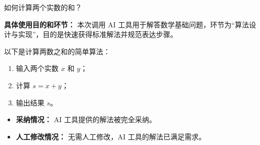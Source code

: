 \begin{tcolorbox}[colback=orange!10, colframe=orange!60, title={\textcolor{black}{用户提问}}]
如何计算两个实数的和？
\vspace{0.5em}
\begin{flushright}
    \scriptsize
    \begin{flushleft}
        \textbf{具体使用目的和环节：} 本次调用 AI 工具用于解答数学基础问题，环节为“算法设计与实现”，目的是快速获得标准解法并规范表达步骤。
    \end{flushleft}
\end{flushright}
\end{tcolorbox}


\begin{GPTblock}
以下是计算两数之和的简单算法：
\begin{enumerate}
    \item 输入两个实数 $x$ 和 $y$；
    \item 计算 $s = x + y$；
    \item 输出结果 $s$。
\end{enumerate}
\end{GPTblock}

\begin{tcolorbox}[colback=green!10, colframe=green!50, title={\textcolor{black}{采纳和人工修改情况}}]
\begin{itemize}
    \item \textbf{采纳情况：} AI 工具提供的解法被完全采纳。
    \item \textbf{人工修改情况：} 无需人工修改，AI 工具的解法已满足需求。
\end{itemize}
\end{tcolorbox}
